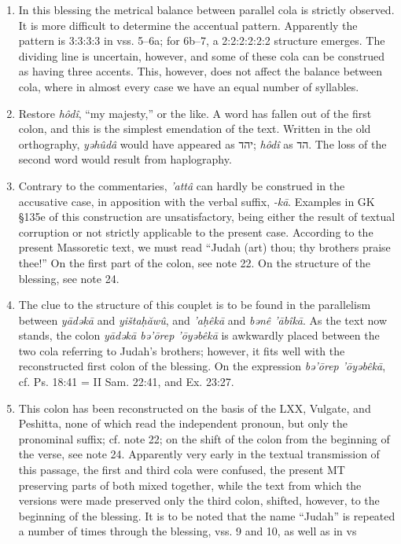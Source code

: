 \begin{enumerate}
\item
In this blessing the metrical balance between parallel cola is strictly
observed. It is more difficult to determine the accentual pattern. Apparently
the pattern is 3:3:3:3 in vss. 5--6a; for 6b--7, a 2:2:2:2:2:2 structure
emerges. The dividing line is uncertain, however, and some of these cola can
be construed as having three accents. This, however, does not affect the
balance between cola, where in almost every case we have an equal number of
syllables.

\item
Restore \emph{hôdî}, ``my majesty,'' or the like. A word has fallen out of the
first colon, and this is the simplest emendation of the text. Written in the
old orthography, \emph{yəhûdâ} would have appeared as יהד; \emph{hôdî} as הד.
The loss of the second word would result from haplography.

\item
Contrary to the commentaries, \emph{'attâ} can hardly be construed in the
accusative case, in apposition with the verbal suffix, \emph{-kā}. Examples in
GK §135e of this construction are unsatisfactory, being either the result of
textual corruption or not strictly applicable to the present case. According
to the present Massoretic text, we must read ``Judah (art) thou; thy brothers
praise thee!'' On the first part of the colon, see note 22. On the structure
of the blessing, see note 24.

\item
The clue to the structure of this couplet is to be found in the parallelism
between \emph{yādəkā} and \emph{yištaḥăwû}, and \emph{'aḥêkā} and
\emph{bənê 'ābîkā}. As the text now stands, the colon \emph{yādəkā bə'ōrep
'ōyəbêkā} is awkwardly placed between the two cola referring to Judah's
brothers; however, it fits well with the reconstructed first colon of the
blessing. On the expression \emph{bə'ōrep 'ōyəbêkā}, cf. Ps. 18:41 =
II Sam. 22:41, and Ex. 23:27.

\item
This colon has been reconstructed on the basis of the LXX, Vulgate, and
Peshitta, none of which read the independent pronoun, but only the pronominal
suffix; cf. note 22; on the shift of the colon from the beginning of the verse,
see note 24. Apparently very early in the textual transmission of this passage,
the first and third cola were confused, the present MT preserving parts of
both mixed together, while the text from which the versions were made
preserved only the third colon, shifted, however, to the beginning of the
blessing. It is to be noted that the name ``Judah'' is repeated a number of
times through the blessing, vss. 9 and 10, as well as in vs


\end{enumerate}
